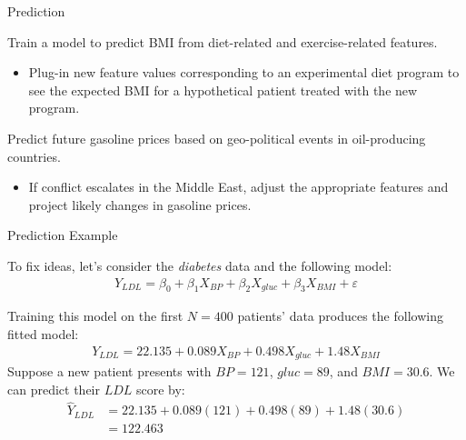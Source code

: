 \documentclass{beamer}\usepackage[]{graphicx}\usepackage[]{color}
\begin{document}
\watermarkon %

\begin{frame}{Prediction}
  
  Train a model to predict BMI from diet-related and exercise-related features.
  \vb
  \begin{itemize}
  \item Plug-in new feature values corresponding to an experimental diet
    program to see the expected BMI for a hypothetical patient treated with the
    new program.  
  \end{itemize}
  \vb 
  Predict future gasoline prices based on geo-political events in
  oil-producing countries.  
  \vb
  \begin{itemize}
    \item If conflict escalates in the Middle East, adjust the appropriate
      features and project likely changes in gasoline prices.
  \end{itemize}
  
\end{frame}


\begin{frame}{Prediction Example}
  
  To fix ideas, let's consider the \emph{diabetes} data and the following model:
  \begin{align*}
    Y_{LDL} = \beta_0 + \beta_1 X_{BP} + \beta_2 X_{gluc} + \beta_3 X_{BMI} + 
    \varepsilon
  \end{align*}
  


Training this model on the first $N = 400$ patients' data produces the following
fitted model:
\begin{align*}
  Y_{LDL} = 22.135 + 0.089 X_{BP} + 0.498 X_{gluc} + 
  1.48 X_{BMI}
\end{align*}
\pause
Suppose a new patient presents with $BP = 121$, $gluc = 89$, and
$BMI = 30.6$. We can predict their $LDL$ score by:
\begin{align*}
  \hat{Y}_{LDL} &= 22.135 + 0.089 (121) + 0.498 
  (89) + 1.48 (30.6)\\
  &= 122.463
\end{align*}

\end{frame}

\end{document}
